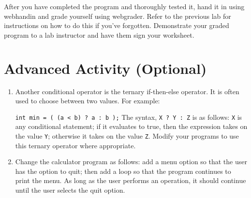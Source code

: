 \documentclass[12pt]{scrartcl}
\begin{document}
After you have completed the program and thoroughly tested it, hand 
it in using webhandin and grade yourself using webgrader.  Refer to 
the previous lab for instructions on how to do this if you've forgotten.  
Demonstrate your graded program to a lab instructor and have them 
sign your worksheet.

\section{Advanced Activity (Optional)}

\begin{enumerate}
  \item Another conditional operator is the ternary if-then-else operator.  
  	It is often used to choose between two values.  For example:
	
	\texttt{int min = ( (a < b) ? a : b );}
	The syntax, \texttt{X ? Y : Z} is as follows: \texttt{X} 
	is any conditional statement; if it evaluates to true, then the 
	expression takes on the value \texttt{Y}; otherwise it takes 
	on the value \texttt{Z}.  Modify your programs to use this 
	ternary operator where appropriate.
  \item Change the calculator program as follows: add a menu option 
	so that the user has the option to quit; then add a loop so that 
	the program continues to print the menu.  As long as the user 
	performs an operation, it should continue until the user selects 
	the quit option.
\end{enumerate}
\end{document}
